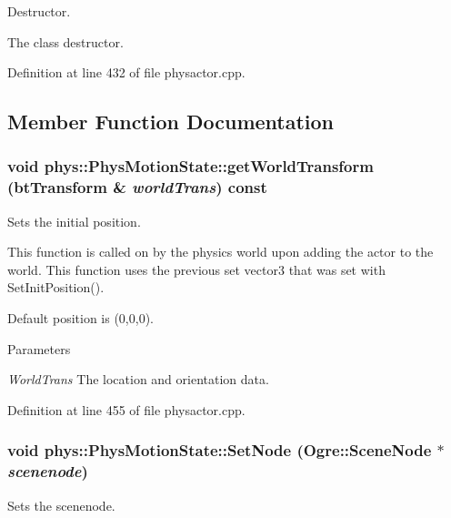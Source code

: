 Destructor. 

The class destructor. 

Definition at line 432 of file physactor.cpp.



\subsection{Member Function Documentation}
\hypertarget{classphys_1_1PhysMotionState_a80e8549fbab99150ba8f34aa3bf087d8}{
\subsubsection[{getWorldTransform}]{\setlength{\rightskip}{0pt plus 5cm}void phys::PhysMotionState::getWorldTransform (btTransform \& {\em worldTrans}) const}}
\label{dc/d0d/classphys_1_1PhysMotionState_a80e8549fbab99150ba8f34aa3bf087d8}


Sets the initial position. 

This function is called on by the physics world upon adding the actor to the world. This function uses the previous set vector3 that was set with SetInitPosition(). \par
 Default position is (0,0,0). 
\begin{DoxyParams}{Parameters}
\item[{\em WorldTrans}]The location and orientation data. \end{DoxyParams}


Definition at line 455 of file physactor.cpp.

\hypertarget{classphys_1_1PhysMotionState_a034376e768543b377430611dff323412}{
\subsubsection[{SetNode}]{\setlength{\rightskip}{0pt plus 5cm}void phys::PhysMotionState::SetNode (Ogre::SceneNode $\ast$ {\em scenenode})}}
\label{dc/d0d/classphys_1_1PhysMotionState_a034376e768543b377430611dff323412}


Sets the scenenode. 

